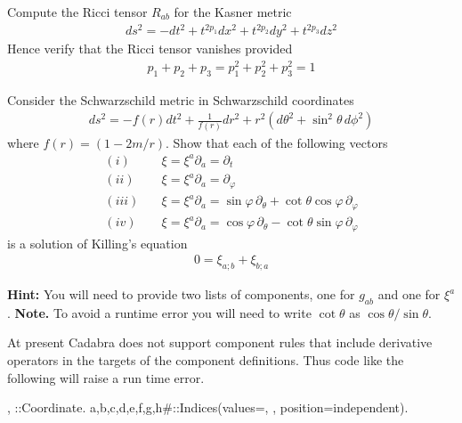 \documentclass[a4paper,12pt]{article}
\numberwithin{equation}{section}%
\begin{document}
\begin{Exercises}
   \begin{Exercise}
      Compute the Ricci tensor $R_{ab}$ for the Kasner metric
      \begin{align*}
         ds^2 = -dt^2 + t^{2p_1} dx^2 + t^{2p_2} dy^2 + t^{2p_3} dz^2
      \end{align*}
      Hence verify that the Ricci tensor vanishes provided
      \begin{align*}
         p_1 + p_2 + p_3 = p^2_1 + p^2_2 +p^2_3 = 1
      \end{align*}
   \end{Exercise}

   \begin{Exercise}
      Consider the Schwarzschild metric in Schwarzschild coordinates
      \begin{align*}
         ds^2 = - f(r) dt^2
                + \frac{1}{f(r)} dr^2
                + r^2\left(d\theta^2 + \sin^2\theta\, d\phi^2\right)
      \end{align*}
      where $f(r) = (1-2m/r)$. Show that each of the following vectors
      \begin{align*}
         (i)   \quad & \xi = \xi^{a}\partial_{a} = \partial_{t}\\
         (ii)  \quad & \xi = \xi^{a}\partial_{a} = \partial_{\varphi}\\
         (iii) \quad & \xi = \xi^{a}\partial_{a}
                           = \sin\varphi\, \partial_{\theta}
                             + \cot\theta \cos\varphi\, \partial_{\varphi}\\
         (iv)  \quad & \xi = \xi^{a}\partial_{a}
                           = \cos\varphi\, \partial_{\theta}
                             - \cot\theta \sin\varphi\, \partial_{\varphi}
      \end{align*}
      is a solution of Killing's equation
      \begin{align*}
         0 = \xi_{a;b} + \xi_{b;a}
      \end{align*}

      {\bf Hint:} You will need to provide two lists of components,
                  one for $g_{ab}$ and one for $\xi^{a}$.
      {\bf Note.} To avoid a runtime error you will need to write
                  $\cot\theta$ as $\cos\theta/\sin\theta$.
   \end{Exercise}

   \begin{Exercise}
      At present Cadabra does not support component rules that include derivative
      operators in the targets of the component definitions. Thus code like the
      following will raise a run time error.
      \begin{cadabra}
         {\theta, \varphi}::Coordinate.
         {a,b,c,d,e,f,g,h#}::Indices(values={\theta, \varphi}, position=independent).


\end{cadabra}
\end{Exercise}
\end{Exercises}
\end{document}
